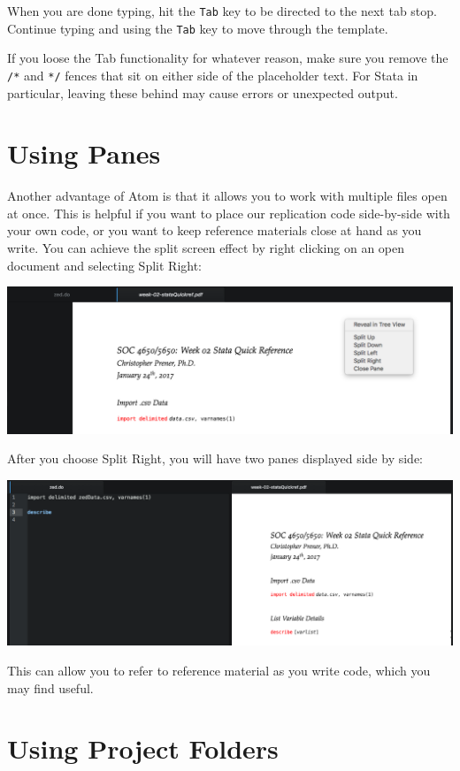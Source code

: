 \documentclass[]{book}
\theoremstyle{definition}
\theoremstyle{definition}
\theoremstyle{definition}
\theoremstyle{remark}
\begin{document}
When you are done typing, hit the \texttt{Tab} key to be directed to the
next tab stop. Continue typing and using the \texttt{Tab} key to move
through the template.

If you loose the Tab functionality for whatever reason, make sure you
remove the \texttt{/*} and \texttt{*/} fences that sit on either side of
the placeholder text. For Stata in particular, leaving these behind may
cause errors or unexpected output.

\section{Using Panes}\label{using-panes}

Another advantage of Atom is that it allows you to work with multiple
files open at once. This is helpful if you want to place our replication
code side-by-side with your own code, or you want to keep reference
materials close at hand as you write. You can achieve the split screen
effect by right clicking on an open document and selecting Split Right:

\includegraphics[width=1\linewidth]{images/atomSplit}

After you choose Split Right, you will have two panes displayed side by
side:

\includegraphics[width=1\linewidth]{images/atomSplit2}

This can allow you to refer to reference material as you write code,
which you may find useful.

\section{Using Project Folders}\label{using-project-folders}
\end{document}
